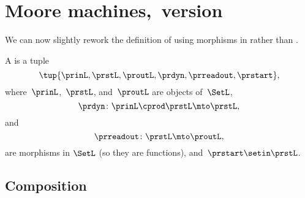 
\section{Moore machines,~\SetL version}
We can now slightly rework the definition of  using morphisms in \SetL rather than \Set.
\begin{definition}
    \label{def:moore_machine_3rd}
    A  is a tuple
    \begin{equation}
        \label{eq:moore-tuple-improved-again}
        \tup{\prinL,\prstL,\proutL,\prdyn,\prreadout,\prstart},
    \end{equation}
    where~$\prinL$,~$\prstL$, and~$\proutL$ are objects of~$\SetL$,
    \begin{equation}
        \prdyn \colon \prinL \cprod \prstL \mto \prstL,
    \end{equation}
    and
    \begin{equation}
        \prreadout \colon \prstL \mto \proutL,
    \end{equation}
    are morphisms in $\SetL$ (so they are functions),
    and~$\prstart \setin \prstL$.
\end{definition}

\subsection{Composition}
\label{sec:composition-of-Moore-machines}

